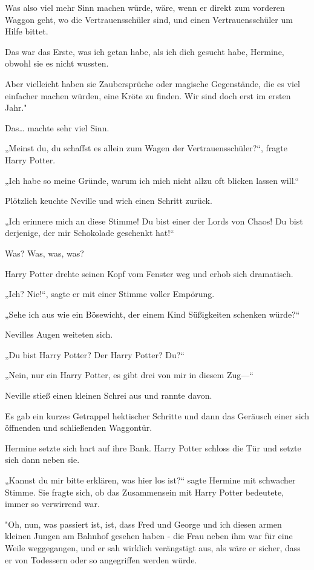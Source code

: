 {Was also viel mehr Sinn machen würde, wäre, wenn er direkt zum vorderen Waggon geht, wo die Vertrauensschüler sind, und einen Vertrauensschüler um Hilfe bittet.

Das war das Erste, was ich getan habe, als ich dich gesucht habe, Hermine, obwohl sie es nicht wussten.

Aber vielleicht haben sie Zaubersprüche oder magische Gegenstände, die es viel einfacher machen würden, eine Kröte zu finden. Wir sind doch erst im ersten Jahr."

Das… machte sehr viel Sinn.

„Meinst du, du schaffst es allein zum Wagen der Vertrauensschüler?“, fragte Harry Potter.

„Ich habe so meine Gründe, warum ich mich nicht allzu oft blicken lassen will.“

Plötzlich keuchte Neville und wich einen Schritt zurück.

„Ich erinnere mich an diese Stimme! Du bist einer der Lords von Chaos! Du bist derjenige, der mir Schokolade geschenkt hat!“

Was? Was, was, was?

Harry Potter drehte seinen Kopf vom Fenster weg und erhob sich dramatisch.

„Ich? Nie!“, sagte er mit einer Stimme voller Empörung.

„Sehe ich aus wie ein Bösewicht, der einem Kind Süßigkeiten schenken würde?“

Nevilles Augen weiteten sich.

„Du bist Harry Potter? Der Harry Potter? Du?“

„Nein, nur ein Harry Potter, es gibt drei von mir in diesem Zug—“

Neville stieß einen kleinen Schrei aus und rannte davon.

Es gab ein kurzes Getrappel hektischer Schritte und dann das Geräusch einer sich öffnenden und schließenden Waggontür.

Hermine setzte sich hart auf ihre Bank. Harry Potter schloss die Tür und setzte sich dann neben sie.

„Kannst du mir bitte erklären, was hier los ist?“ sagte Hermine mit schwacher Stimme. Sie fragte sich, ob das Zusammensein mit Harry Potter bedeutete, immer so verwirrend war.

"Oh, nun, was passiert ist, ist, dass Fred und George und ich diesen armen kleinen Jungen am Bahnhof gesehen haben - die Frau neben ihm war für eine Weile weggegangen, und er sah wirklich verängstigt aus, als wäre er sicher, dass er von Todessern oder so angegriffen werden würde.

}
